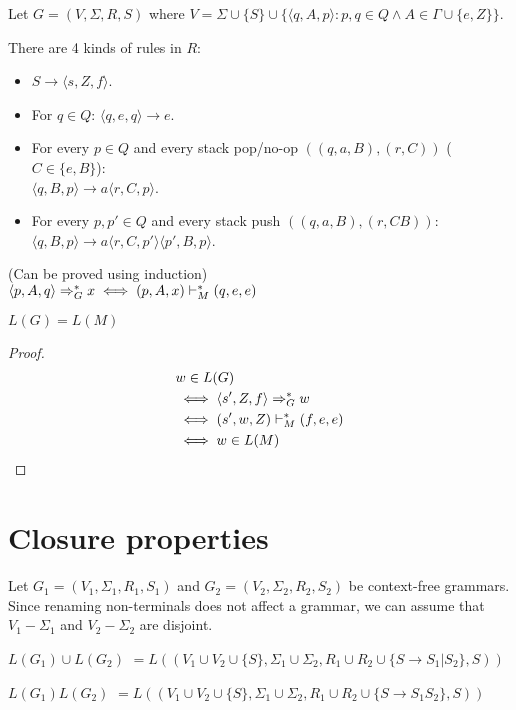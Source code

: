 Let $G = (V, \Sigma, R, S)$ where
$V = \Sigma \cup \{S\} \cup \{\langle q, A, p \rangle: p, q \in Q \wedge A \in \Gamma \cup \{e, Z\}\}$.

There are 4 kinds of rules in $R$:
\begin{itemize}
\item $S \rightarrow \langle s, Z, f \rangle$.
\item For $q \in Q$: $\langle q, e, q \rangle \rightarrow e$.
\item For every $p \in Q$ and every stack pop/no-op $((q,a,B), (r,C))$ ($C \in \{e, B\}$):\\
$\langle q, B, p \rangle \rightarrow a \langle r, C, p \rangle$.
\item For every $p, p' \in Q$ and every stack push $((q,a,B), (r,CB))$:\\
$\langle q, B, p \rangle \rightarrow a \langle r, C, p' \rangle \langle p', B, p \rangle$.
\end{itemize}

\begin{lemma}(Can be proved using induction)\\
$\langle p, A, q \rangle \Rightarrow_{G}^* x \iff (p, A, x) \vdash_M^* (q, e, e)$
\end{lemma}
\begin{theorem}$L(G) = L(M)$\end{theorem}
\begin{proof}
\begin{align*}
& w \in L(G)
\\ &\iff \langle s', Z, f \rangle \Rightarrow_{G}^* w
\\ &\iff (s', w, Z) \vdash_M^* (f, e, e)
\\ &\iff w \in L(M)
\end{align*}
\end{proof}

\section{Closure properties}

Let $G_1 = (V_1, \Sigma_1, R_1, S_1)$ and $G_2 = (V_2, \Sigma_2, R_2, S_2)$
be context-free grammars. Since renaming non-terminals does not affect a grammar,
we can assume that $V_1 - \Sigma_1$ and $V_2 - \Sigma_2$ are disjoint.

$L(G_1) \cup L(G_2)$
$= L((V_1 \cup V_2 \cup \{S\}, \Sigma_1 \cup \Sigma_2,
R_1 \cup R_2 \cup \{S \rightarrow S_1 | S_2 \}, S))$

$L(G_1)L(G_2)$
$= L((V_1 \cup V_2 \cup \{S\}, \Sigma_1 \cup \Sigma_2,
R_1 \cup R_2 \cup \{S \rightarrow S_1S_2 \}, S))$

